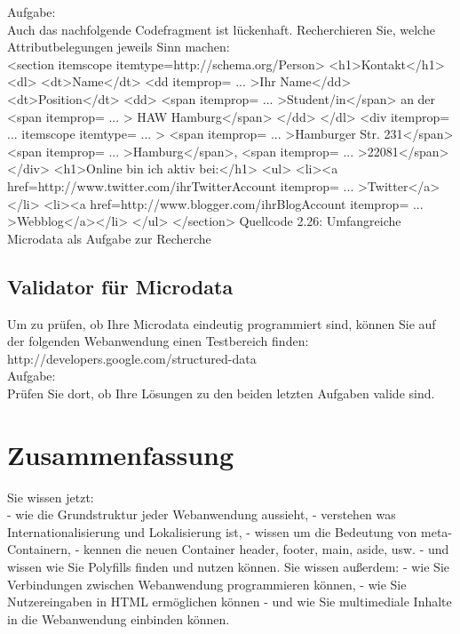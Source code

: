 Aufgabe:\\

Auch das nachfolgende Codefragment ist lückenhaft. Recherchieren Sie, welche Attributbelegungen jeweils Sinn machen:\\

<section itemscope itemtype=http://schema.org/Person>
<h1>Kontakt</h1>
<dl>
<dt>Name</dt>
<dd itemprop= ... >Ihr Name</dd>
<dt>Position</dt>
<dd>
<span itemprop= ... >Student/in</span> an der
<span itemprop= ... > HAW Hamburg</span>
</dd>
</dl>
<div itemprop= ... itemscope itemtype= ... >
<span itemprop= ... >Hamburger Str. 231</span>
<span itemprop= ... >Hamburg</span>,
<span itemprop= ... >22081</span>
</div>
<h1>Online bin ich aktiv bei:</h1>
<ul>
<li><a href=http://www.twitter.com/ihrTwitterAccount itemprop= ... >Twitter</a></li>
<li><a href=http://www.blogger.com/ihrBlogAccount itemprop= ... >Webblog</a></li>
</ul>
</section>
Quellcode 2.26: Umfangreiche Microdata als Aufgabe zur Recherche

\subsection{Validator für Microdata}

Um zu prüfen, ob Ihre Microdata eindeutig programmiert sind, können Sie auf der folgenden Webanwendung einen Testbereich finden:\\

http://developers.google.com/structured-data  \\

Aufgabe:\\

Prüfen Sie dort, ob Ihre Lösungen zu den beiden letzten Aufgaben valide sind.

\section{Zusammenfassung}

Sie wissen jetzt:\\

-	wie die Grundstruktur jeder Webanwendung aussieht,
-	verstehen was Internationalisierung und Lokalisierung ist,
-	wissen um die Bedeutung von meta-Containern,
-	kennen die neuen Container header, footer, main, aside, usw.
-	und wissen wie Sie Polyfills finden und nutzen können.
Sie wissen außerdem:
-	wie Sie Verbindungen zwischen Webanwendung programmieren können,
-	wie Sie Nutzereingaben in HTML ermöglichen können
-	und wie Sie multimediale Inhalte in die Webanwendung einbinden können.\\

